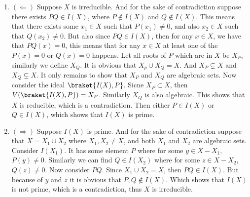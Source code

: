 \begin{enumerate}[label=]
    \item $(\Leftarrow)$
        Suppose $X$ is irreducible. And for the sake of contradiction suppose there exists $PQ \in I(X)$, where $P \notin I(X)$ and $Q \notin I(X)$. This means that there exists some $x_1 \in X$ such that $P(x_1) \ne 0$, and also $x_2 \in X$ such that $Q(x_2) \ne 0$. But also since $PQ \in I(X)$, then for any $x \in X$, we have that $PQ(x) = 0$, this means that for any $x \in X$ at least one of the $P(x) = 0$ or $Q(x) = 0$ happens. Let all roots of $P$ which are in $X$ be $X_P$, similarly we define $X_Q$. It is obvious that $X_p \cup X_Q = X$. And $X_P \subsetneq X$ and $X_Q \subsetneq X$. It only remains to show that $X_P$ and $X_Q$ are algebraic sets. Now consider the ideal $\braket{I(X), P}$. Sicne $X_P \subset X$, then $V(\braket{I(X), P}) = X_P$. Similarly $X_Q$ is also algebraic. This shows that $X$ is reducible, which is a contradiction. Then either $P \in I(X)$ or $Q \in I(X)$, which shows that $I(X)$ is prime.
    \item $(\Rightarrow)$
        Suppose $I(X)$ is prime. And for the sake of contradiction suppose that $X = X_1 \cup X_2$ where $X_1 , X_2 \ne X$, and both $X_1$ and $X_2$ are algebraic sets. Consider $I(X_1)$. It has some element $P$ where for some $y \in X - X_1$, $P(y) \ne 0$. Similarly we can find $Q \in I(X_2)$ where for some $z \in X - X_2$, $Q(z) \ne 0$. Now consider $PQ$. Since $X_1 \cup X_2 = X$, then $PQ \in I(X)$. But because of $y$ and $z$ it is obvious that $P, Q \notin I(X)$. Which shows that $I(X)$ is not prime, which is a contradiction, thus $X$ is irreducible.
\end{enumerate}